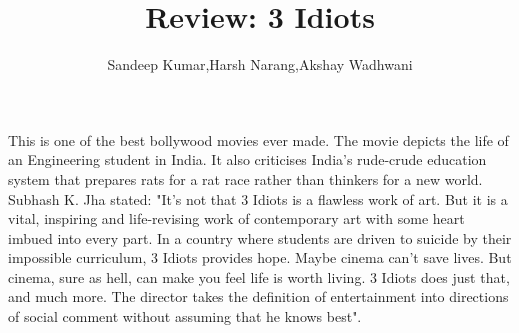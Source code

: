 \documentclass{article}
\title{Review: 3 Idiots}
\author{Sandeep Kumar,Harsh Narang,Akshay Wadhwani}
\begin{document}
\maketitle
This is one of the best bollywood movies ever made. The movie depicts the life of an Engineering student in India. It also criticises India's rude-crude education system that prepares rats for a rat race rather than thinkers for a new world.\\
Subhash K. Jha stated: "It's not that 3 Idiots is a flawless work of art. But it is a vital, inspiring and life-revising work of contemporary art with some heart imbued into every part. In a country where students are driven to suicide by their impossible curriculum, 3 Idiots provides hope. Maybe cinema can't save lives. But cinema, sure as hell, can make you feel life is worth living. 3 Idiots does just that, and much more. The director takes the definition of entertainment into directions of social comment without assuming that he knows best".\\
\end{document}
